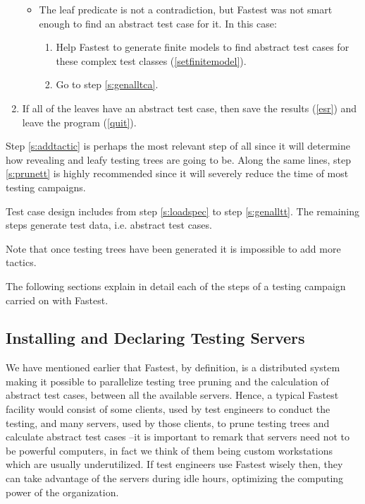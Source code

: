 \begin{enumerate}
\begin{itemize}
\item The leaf predicate is not a contradiction, but Fastest was not smart enough to find an abstract test case for it. In this case: 
\begin{enumerate}
\item Help Fastest to generate finite models to find abstract test cases for these complex test classes (\ref{setfinitemodel}).

\item Go to step \ref{s:genalltca}.
\end{enumerate}
\end{itemize}

\item If all of the leaves have an abstract test case, then save the results (\ref{esr}) and leave the program (\ref{quit}).
\end{enumerate} 

Step \ref{s:addtactic} is perhaps the most relevant step of all since it will determine how revealing and leafy testing trees are going to be. Along the same lines, step \ref{s:prunett} is highly recommended since it will severely reduce the time of most testing campaigns.

Test case design includes from step \ref{s:loadspec} to step \ref{s:genalltt}. The remaining steps generate test data, i.e. abstract test cases.

Note that once testing trees have been generated it is impossible to add more tactics.

The following sections explain in detail each of the steps of a testing campaign carried on with Fastest.


\subsection{\label{idts}Installing and Declaring Testing Servers}

We have mentioned earlier that Fastest, by definition, is a distributed system making it possible to parallelize testing tree pruning and the calculation of abstract test cases, between all the available servers. Hence, a typical Fastest facility would consist of some clients, used by test engineers to conduct the testing, and many servers, used by those clients, to prune testing trees and calculate abstract test cases --it is important to remark that servers need not to be powerful computers, in fact we think of them being custom workstations which are usually underutilized. If test engineers use Fastest wisely then, they can take advantage of the servers during idle hours, optimizing the computing power of the organization.

